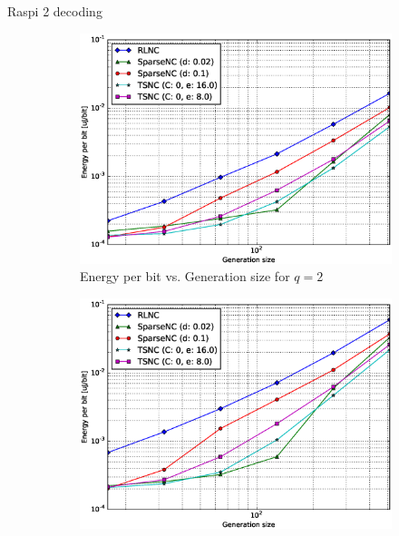 Raspi 2 decoding

\begin{figure}
    \centering
    \begin{subfigure}[b]{0.475\textwidth}
        \centering
        \includegraphics[width=1.1\textwidth]{images/06_06_2016/energy_per_bit_vs_generation_size_Rasp_v2_Binary_decoder_1600.eps}
        \caption[]%
        {{\small Energy per bit vs. Generation size for $q = 2$}}
        \label{fig:dec_ene_rasp2_gen_gf2}
    \end{subfigure}
    \hfill
    \begin{subfigure}[b]{0.475\textwidth}
        \centering
        \includegraphics[width=1.1\textwidth]{images/06_06_2016/energy_per_bit_vs_generation_size_Rasp_v2_Binary8_decoder_1600.eps}

\end{subfigure}
\end{figure}

